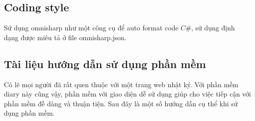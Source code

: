 \documentclass[a4paper]{article}
\begin{document}
\subsection{Coding style}

Sử dụng omnisharp như một công cụ để auto format code \(C\#\), sử dụng định dạng được miêu tả ở file omnisharp.json.


\subsection{Tài liệu hướng dẫn sử dụng phần mềm}

	Có lẽ mọi người đã rất quen thuộc với một trang web nhật ký. Với phần mềm diary này cũng vậy, phần mềm với giao diện dễ sử dụng giúp cho việc tiếp cận với phần mềm đễ dàng và thuận tiện. Sau đây là một số hướng dẫn cụ thể khi sử dụng phần mềm.
\end{document}

